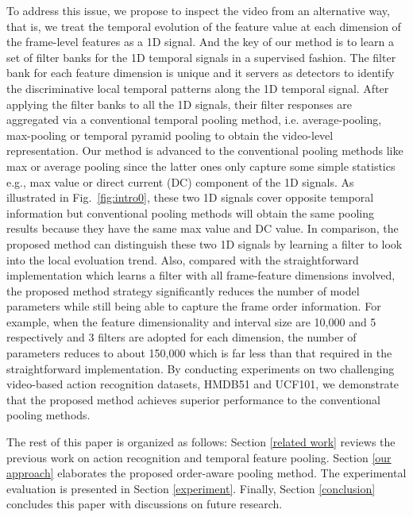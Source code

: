 \documentclass[journal]{IEEEtran}
\begin{document}
To address this issue, we propose to inspect the video from an alternative way, that is, we treat the temporal evolution of the feature value at each dimension of the frame-level features as a 1D signal. And the key of our method is to learn a set of filter banks for the 1D temporal signals in a supervised fashion. The filter bank for each feature dimension is unique and it servers as detectors to identify the discriminative local temporal patterns along the 1D temporal signal. After applying the filter banks to all the 1D signals, their filter responses are aggregated via a conventional temporal pooling method, i.e. average-pooling, max-pooling or temporal pyramid pooling to obtain the video-level representation.
Our method is advanced to the conventional pooling methods like max or average pooling since the latter ones only capture some simple statistics e.g., max value or direct current (DC) component of the 1D signals. As illustrated in Fig.~\ref{fig:intro0}, these two 1D signals cover opposite temporal information but conventional pooling methods will obtain the same pooling results because they have the same max value and DC value. In comparison, the proposed method can distinguish these two 1D signals by learning a filter to look into the local evoluation trend. Also, compared with the straightforward implementation which learns a filter with all frame-feature dimensions involved, the proposed method strategy significantly reduces the number of model parameters while still being able to capture the frame order information. For example, when the feature dimensionality and interval size are 10,000 and 5 respectively and 3 filters are adopted for each dimension, the number of parameters reduces to about 150,000 which is far less than that required in the  straightforward implementation. By conducting experiments on two challenging video-based action recognition datasets, HMDB51 and UCF101, we demonstrate that the proposed method achieves superior performance to the conventional pooling methods.

The rest of this paper is organized as follows: Section \ref{related work} reviews the previous work on action recognition and temporal feature pooling. Section \ref{our approach} elaborates the proposed order-aware pooling method. The experimental evaluation is presented in Section \ref{experiment}. Finally, Section \ref{conclusion} concludes this paper with discussions on future research.
\end{document}
